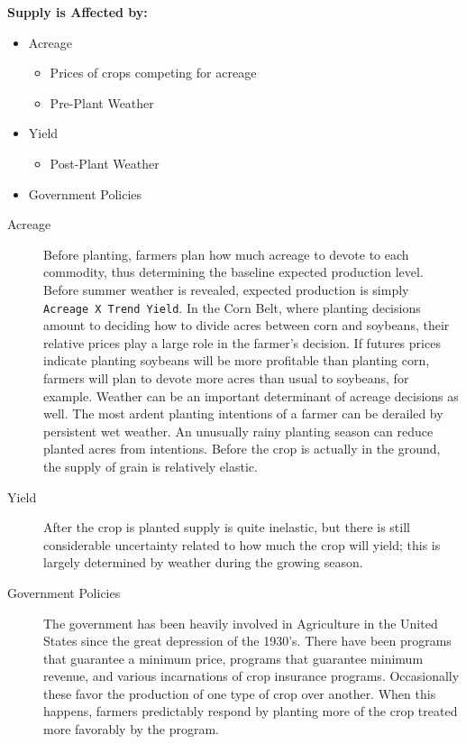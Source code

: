 \documentclass[
]{book}
\providecommand{\tightlist}{%
  \setlength{\itemsep}{0pt}\setlength{\parskip}{0pt}}
\begin{document}
\textbf{Supply is Affected by:}

\begin{itemize}
\item
  Acreage

  \begin{itemize}
  \tightlist
  \item
    Prices of crops competing for acreage
  \item
    Pre-Plant Weather
  \end{itemize}
\item
  Yield

  \begin{itemize}
  \tightlist
  \item
    Post-Plant Weather
  \end{itemize}
\item
  Government Policies
\end{itemize}

\begin{description}
\item[Acreage]
Before planting, farmers plan how much acreage to devote to each commodity, thus determining the baseline expected production level. Before summer weather is revealed, expected production is simply \texttt{Acreage\ X\ Trend\ Yield}. In the Corn Belt, where planting decisions amount to deciding how to divide acres between corn and soybeans, their relative prices play a large role in the farmer's decision. If futures prices indicate planting soybeans will be more profitable than planting corn, farmers will plan to devote more acres than usual to soybeans, for example. Weather can be an important determinant of acreage decisions as well. The most ardent planting intentions of a farmer can be derailed by persistent wet weather. An unusually rainy planting season can reduce planted acres from intentions. Before the crop is actually in the ground, the supply of grain is relatively elastic.
\item[Yield]
After the crop is planted supply is quite inelastic, but there is still considerable uncertainty related to how much the crop will yield; this is largely determined by weather during the growing season.
\item[Government Policies]
The government has been heavily involved in Agriculture in the United States since the great depression of the 1930's. There have been programs that guarantee a minimum price, programs that guarantee minimum revenue, and various incarnations of crop insurance programs. Occasionally these favor the production of one type of crop over another. When this happens, farmers predictably respond by planting more of the crop treated more favorably by the program.
\end{description}
\end{document}
